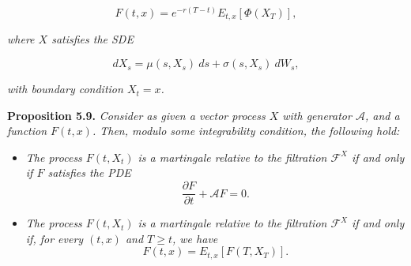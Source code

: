 \documentclass[
]{article}
\providecommand{\tightlist}{%
  \setlength{\itemsep}{0pt}\setlength{\parskip}{0pt}}
\begin{document}
\[
F(t,x)=e^{-r(T-t)}E_{t,x}[\Phi(X_T)],\tag{5.39}
\]

\emph{where \(X\) satisfies the SDE}

\[
dX_s=\mu(s,X_s)\ ds+\sigma(s,X_s)\ dW_s,\tag{5.40}
\]

\emph{with boundary condition \(X_t=x\).}

\textbf{Proposition 5.9.} \emph{Consider as given a vector process \(X\)
with generator \(\mathcal{A}\), and a function \(F(t,x)\). Then, modulo
some integrability condition, the following hold:}

\begin{itemize}
\tightlist
\item
  \emph{The process \(F(t,X_t)\) is a martingale relative to the
  filtration \(\mathcal{F}^X\) if and only if \(F\) satisfies the PDE}
  \[
    \frac{\partial F}{\partial t}+\mathcal{A}F=0.
    \]
\item
  \emph{The process \(F(t,X_t)\) is a martingale relative to the
  filtration \(\mathcal{F}^X\) if and only if, for every \((t,x)\) and
  \(T\ge t\), we have} \[
    F(t,x)=E_{t,x}[F(T,X_T)].
    \]
\end{itemize}
\end{document}
